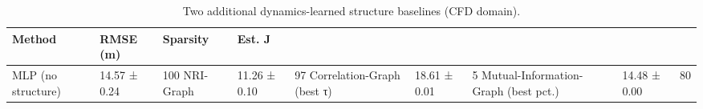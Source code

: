 \begin{table}
\caption{Two additional dynamics-learned structure baselines (CFD domain).}
\label{tab:additional-baselines}
\begin{tabular}{llll}
\toprule
Method & RMSE (m) & Sparsity & Est. J \\
\midrule
MLP (no structure) & 14.57 ± 0.24 & 100%
NRI-Graph & 11.26 ± 0.10 & 97%
Correlation-Graph (best τ) & 18.61 ± 0.01 & 5%
Mutual-Information-Graph (best pct.) & 14.48 ± 0.00 & 80%
\bottomrule
\end{tabular}
\end{table}
